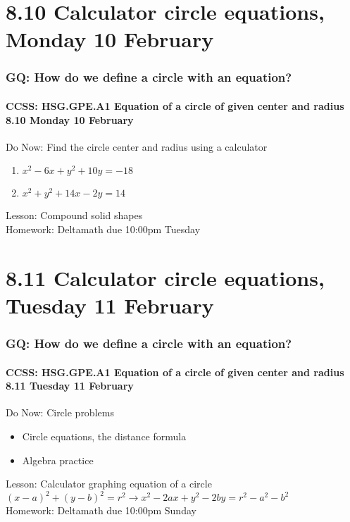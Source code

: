 \documentclass{beamer}
\begin{document}
\section{8.10 Calculator circle equations, Monday 10 February}
\frame
{
  \frametitle{GQ: How do we define a circle with an equation?}
  \framesubtitle{CCSS: HSG.GPE.A1 Equation of a circle of given center and radius \hfill \alert{8.10 Monday 10 February}}

  \begin{block}{Do Now: Find the circle center and radius using a calculator}
  \begin{enumerate}
    \item $x^2-6x+y^2+10y = -18$
    \item $x^2+y^2+14x-2y = 14$
  \end{enumerate}
  \end{block}
  Lesson: Compound solid shapes\\[5pt]
  Homework: Deltamath due 10:00pm Tuesday
}

\section{8.11 Calculator circle equations, Tuesday 11 February}
\frame
{
  \frametitle{GQ: How do we define a circle with an equation?}
  \framesubtitle{CCSS: HSG.GPE.A1 Equation of a circle of given center and radius \hfill \alert{8.11 Tuesday 11 February}}

  \begin{block}{Do Now: Circle problems}
  \begin{itemize}
    \item Circle equations, the distance formula
    \item Algebra practice
  \end{itemize}
  \end{block}
  Lesson: Calculator graphing equation of a circle $(x-a)^2+(y-b)^2=r^2 \rightarrow x^2-2ax+y^2-2by=r^2-a^2-b^2$\\[5pt]
  Homework: Deltamath due 10:00pm Sunday
}
\end{document}
